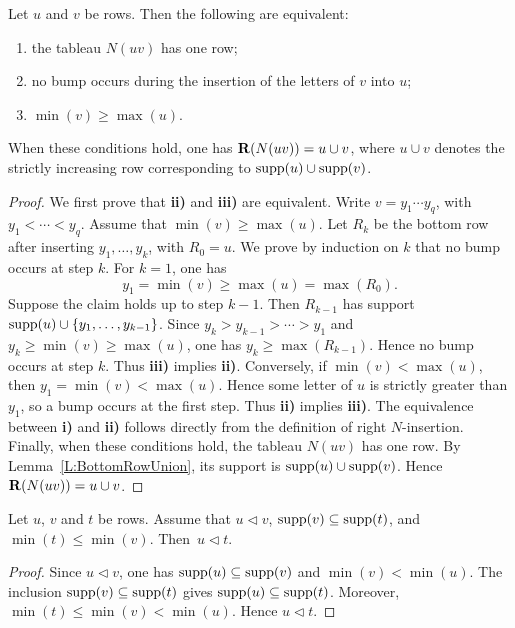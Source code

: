 \documentclass[a4paper, twoside, 11pt, english]{article}
\begin{document}
\begin{lemma}
\label{L:OneRowCriterion}
Let $u$ and $v$ be rows. Then the following are equivalent:
\begin{enumerate}[{\bf i)}]
\item the tableau $N(uv)$ has one row;
\item no bump occurs during the insertion of the letters of $v$ into $u$;
\item $\min(v)\geq \max(u)$.
\end{enumerate}
When these conditions hold, one has $\mathbf{R}(N(uv))=u\cup v$, where $u\cup v$
denotes the strictly increasing row corresponding to $\operatorname{supp}(u)\cup\operatorname{supp}(v)$.
\end{lemma}


\begin{proof}
We first prove that {\bf ii)} and {\bf iii)} are equivalent. Write
$v=y_1\cdots y_q$, with $y_1<\cdots<y_q$.
Assume that $\min(v)\ge\max(u)$. Let $R_k$ be the bottom row after inserting
$y_1,\dots,y_k$, with $R_0=u$. We prove by induction on $k$ that no bump occurs
at step $k$. For $k=1$, one has
\[
y_1=\min(v)\ge\max(u)=\max(R_0).
\]
Suppose the claim holds up to step $k-1$. Then $R_{k-1}$ has support
$\operatorname{supp}(u)\cup\{y_1,\dots,y_{k-1}\}$. Since
$y_k>y_{k-1}>\cdots>y_1$ and $y_k\ge\min(v)\ge\max(u)$, one has
$y_k\ge\max(R_{k-1})$. Hence no bump occurs at step $k$. Thus {\bf iii)}
implies {\bf ii)}.
Conversely, if $\min(v)<\max(u)$, then $y_1=\min(v)<\max(u)$. Hence some
letter of $u$ is strictly greater than $y_1$, so a bump occurs at the first
step. Thus {\bf ii)} implies {\bf iii)}.
The equivalence between {\bf i)} and {\bf ii)} follows directly from the
definition of right $N$-insertion.
Finally, when these conditions hold, the tableau $N(uv)$ has one row. By
Lemma~\ref{L:BottomRowUnion}, its support is $\operatorname{supp}(u)\cup\operatorname{supp}(v)$. Hence
$\mathbf{R}(N(uv))=u\cup v$.
\end{proof}

\begin{lemma}
\label{L:TriangleleftMonotonicity}
Let $u$, $v$ and $t$ be rows. Assume that $u\triangleleft v$,
$\operatorname{supp}(v)\subseteq\operatorname{supp}(t)$, and $\min(t)\le\min(v)$. Then~$u\triangleleft t$.
\end{lemma}

\begin{proof}
Since $u\triangleleft v$, one has $\operatorname{supp}(u)\subseteq\operatorname{supp}(v)$ and
$\min(v)<\min(u)$. The inclusion $\operatorname{supp}(v)\subseteq\operatorname{supp}(t)$ gives
$\operatorname{supp}(u)\subseteq\operatorname{supp}(t)$. Moreover,
$\min(t)\le\min(v)<\min(u)$. Hence $u\triangleleft t$.
\end{proof}
\end{document}
